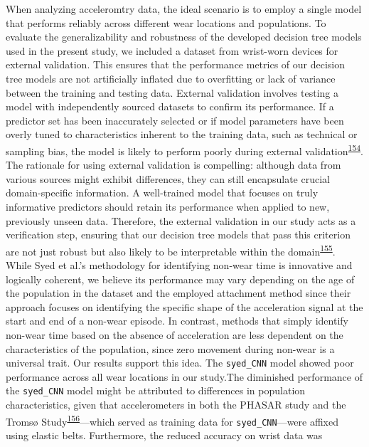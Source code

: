 \documentclass[
  10pt,
]{scrbook}
\begin{document}
When analyzing acceleromtry data, the ideal scenario is to employ a
single model that performs reliably across different wear locations and
populations. To evaluate the generalizability and robustness of the
developed decision tree models used in the present study, we included a
dataset from wrist-worn devices for external validation. This ensures
that the performance metrics of our decision tree models are not
artificially inflated due to overfitting or lack of variance between the
training and testing data. External validation involves testing a model
with independently sourced datasets to confirm its performance. If a
predictor set has been inaccurately selected or if model parameters have
been overly tuned to characteristics inherent to the training data, such
as technical or sampling bias, the model is likely to perform poorly
during external
validation\textsuperscript{\protect\hyperlink{ref-steyerberg_prediction_2016}{154}}.
The rationale for using external validation is compelling: although data
from various sources might exhibit differences, they can still
encapsulate crucial domain-specific information. A well-trained model
that focuses on truly informative predictors should retain its
performance when applied to new, previously unseen data. Therefore, the
external validation in our study acts as a verification step, ensuring
that our decision tree models that pass this criterion are not just
robust but also likely to be interpretable within the
domain\textsuperscript{\protect\hyperlink{ref-altman_prognosis_2009}{155}}.
While Syed et al.'s methodology for identifying non-wear time is
innovative and logically coherent, we believe its performance may vary
depending on the age of the population in the dataset and the employed
attachment method since their approach focuses on identifying the
specific shape of the acceleration signal at the start and end of a
non-wear episode. In contrast, methods that simply identify non-wear
time based on the absence of acceleration are less dependent on the
characteristics of the population, since zero movement during non-wear
is a universal trait. Our results support this idea. The
\texttt{syed\_CNN} model showed poor performance across all wear
locations in our study.The diminished performance of the
\texttt{syed\_CNN} model might be attributed to differences in
population characteristics, given that accelerometers in both the PHASAR
study and the Tromsø
Study\textsuperscript{\protect\hyperlink{ref-sagelv_2019}{156}}---which
served as training data for \texttt{syed\_CNN}---were affixed using
elastic belts. Furthermore, the reduced accuracy on wrist data was
\end{document}
